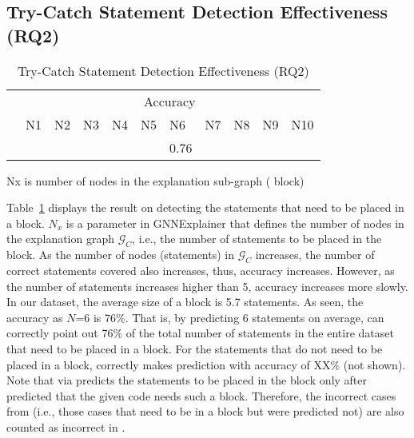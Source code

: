 \subsection{Try-Catch Statement Detection Effectiveness (RQ2)}
\label{sec:rq2}

\begin{table}[t]
  \caption{Try-Catch Statement Detection Effectiveness (RQ2)}
  \vspace{-12pt}
	\begin{center}
		\small
		\renewcommand{\arraystretch}{1} 
		\begin{tabular}{p{0.8cm}<{\centering}|p{0.4cm}<{\centering}|p{0.4cm}<{\centering}|p{0.4cm}<{\centering}|p{0.4cm}<{\centering}|p{0.4cm}<{\centering}|p{0.4cm}<{\centering}|p{0.4cm}<{\centering}|p{0.4cm}<{\centering}|p{0.4cm}<{\centering}|p{0.4cm}<{\centering}}
			\hline
			 	&  \multicolumn{10}{c}{Accuracy} \\
			\cline{2-11}
			     	&  N1  & N2   &  N3  & N4   &N5    & N6   &N7    & N8   &N9    & N10 \\
			\hline
			\tool       &  &  &  &  &  & 0.76 &  &  &  &   \\
			\hline
		\end{tabular}
		Nx is number of nodes in the explanation
                sub-graph ( block)
		\label{tab:rq2}
	\end{center}
\end{table}

Table~\ref{tab:rq2} displays the result on detecting the statements
that need to be placed in a  block. $N_x$ is a parameter
in GNNExplainer that defines the number of nodes in the explanation
graph $\mathcal{G}_C$, i.e., the number of statements to be placed in the
 block.
%
As the number of nodes (statements) in $\mathcal{G}_C$ increases, the
number of correct statements covered also increases, thus, accuracy
increases. However, as the number of statements increases higher than
5, accuracy increases more slowly. In our dataset, the average size of
a  block is 5.7 statements. As seen, the accuracy as
$N$=6 is 76\%. That is, by predicting 6 statements on average, {\tool}
can correctly point out 76\% of the total number of statements in the
entire dataset that need to be placed in a  block.
For the statements that do not need to be placed in a 
block, {\tool} correctly makes prediction with accuracy of XX\% (not
shown). Note that {\tool} via {\xstate} predicts the statements to be
placed in the  block only after {\xblock} predicted
that the given code needs such a block. Therefore, the incorrect cases
from {\xblock} (i.e., those cases that need to be in a
 block but were predicted not) are also counted as
incorrect in {\xstate}.

